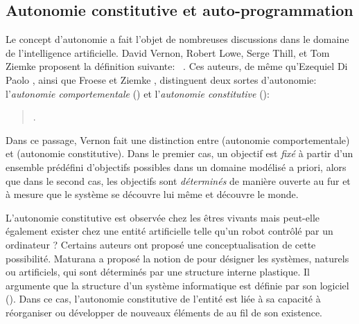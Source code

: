 

\subsection{Autonomie constitutive et auto-programmation}

\noindent
Le concept d'autonomie a fait l'objet de nombreuses discussions dans le domaine de l'intelligence artificielle. 
David Vernon, Robert Lowe, Serge Thill, et Tom Ziemke proposent la définition suivante: 
\og {} \fg\ \cite[p.~3]{vernon_embodied_2015}.
Ces auteurs, de même qu'Ezequiel Di Paolo \cite{di_paolo_autopoiesis_2005}, ainsi que Froese et Ziemke \cite{froese_enactive_2009}, distinguent deux sortes d'autonomie: l'\emph{autonomie comportementale} () et l'\emph{autonomie constitutive} ():  

\begin{quote}
	\cite[p.~3]{vernon_embodied_2015}.
\end{quote}

Dans ce passage, Vernon fait une distinction entre  (autonomie comportementale) et  (autonomie constitutive). 
Dans le premier cas, un objectif est \emph{fixé} à partir d'un ensemble prédéfini d'objectifs possibles dans un domaine modélisé a priori, 
alors que dans le second cas, les objectifs sont \emph{déterminés} de manière ouverte au fur et à mesure que le système se découvre lui même et découvre le monde. 

L'autonomie constitutive est observée chez les êtres vivants mais peut-elle également exister chez une entité artificielle telle qu'un robot contrôlé par un ordinateur ?  
Certains auteurs ont proposé une conceptualisation de cette possibilité. 
Maturana a proposé la notion de  \cite{maturana_organization_1975} pour désigner les systèmes, naturels ou artificiels, qui sont déterminés par une structure interne plastique.
Il argumente que la structure d'un système informatique est définie par son logiciel ().
Dans ce cas, l'autonomie constitutive de l'entité est liée à sa capacité à réorganiser ou développer de nouveaux éléments de  au fil de son existence. 

